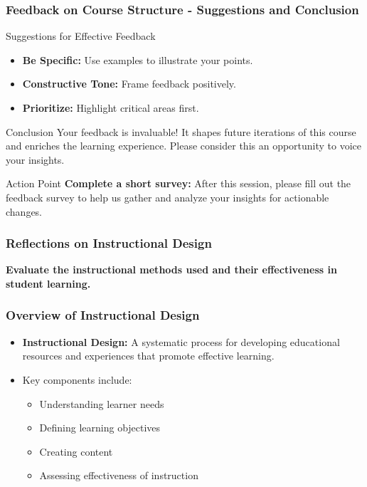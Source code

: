 \documentclass[aspectratio=169]{beamer}
\begin{document}
\begin{frame}[fragile]
    \frametitle{Feedback on Course Structure - Suggestions and Conclusion}
    \begin{block}{Suggestions for Effective Feedback}
        \begin{itemize}
            \item \textbf{Be Specific:} Use examples to illustrate your points.
            \item \textbf{Constructive Tone:} Frame feedback positively.
            \item \textbf{Prioritize:} Highlight critical areas first.
        \end{itemize}
    \end{block}

    \begin{block}{Conclusion}
        Your feedback is invaluable! It shapes future iterations of this course and enriches the learning experience. Please consider this an opportunity to voice your insights.
    \end{block}
    
    \begin{block}{Action Point}
        \textbf{Complete a short survey:} After this session, please fill out the feedback survey to help us gather and analyze your insights for actionable changes.
    \end{block}
\end{frame}

\begin{frame}[fragile]
    \frametitle{Reflections on Instructional Design}
    \textbf{Evaluate the instructional methods used and their effectiveness in student learning.}
\end{frame}

\begin{frame}[fragile]
    \frametitle{Overview of Instructional Design}
    \begin{itemize}
        \item \textbf{Instructional Design:} A systematic process for developing educational resources and experiences that promote effective learning.
        \item Key components include:
        \begin{itemize}
            \item Understanding learner needs
            \item Defining learning objectives
            \item Creating content
            \item Assessing effectiveness of instruction
        \end{itemize}
    \end{itemize}
\end{frame}
\end{document}
